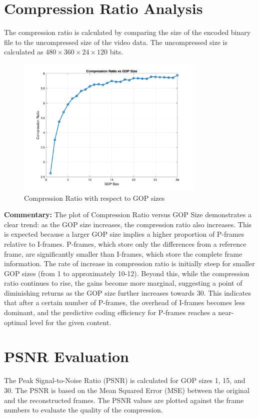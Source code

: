 \documentclass{article}
\begin{document}
\section{Compression Ratio Analysis}
The compression ratio is calculated by comparing the size of the encoded binary file to the uncompressed size of the video data. The uncompressed size is calculated as $480 \times 360 \times 24 \times 120$ bits.

\begin{figure}[h]
    \centering
    \includegraphics[width=0.8\textwidth]{compression_ratio_plot.png}
    \caption{Compression Ratio with respect to GOP sizes}
    \label{fig:compression_ratio}
\end{figure}

\noindent \textbf{Commentary:} The plot of Compression Ratio versus GOP Size demonstrates a clear trend: as the GOP size increases, the compression ratio also increases. This is expected because a larger GOP size implies a higher proportion of P-frames relative to I-frames. P-frames, which store only the differences from a reference frame, are significantly smaller than I-frames, which store the complete frame information. The rate of increase in compression ratio is initially steep for smaller GOP sizes (from 1 to approximately 10-12). Beyond this, while the compression ratio continues to rise, the gains become more marginal, suggesting a point of diminishing returns as the GOP size further increases towards 30. This indicates that after a certain number of P-frames, the overhead of I-frames becomes less dominant, and the predictive coding efficiency for P-frames reaches a near-optimal level for the given content.

\section{PSNR Evaluation}
The Peak Signal-to-Noise Ratio (PSNR) is calculated for GOP sizes 1, 15, and 30. The PSNR is based on the Mean Squared Error (MSE) between the original and the reconstructed frames. The PSNR values are plotted against the frame numbers to evaluate the quality of the compression.
\end{document}
